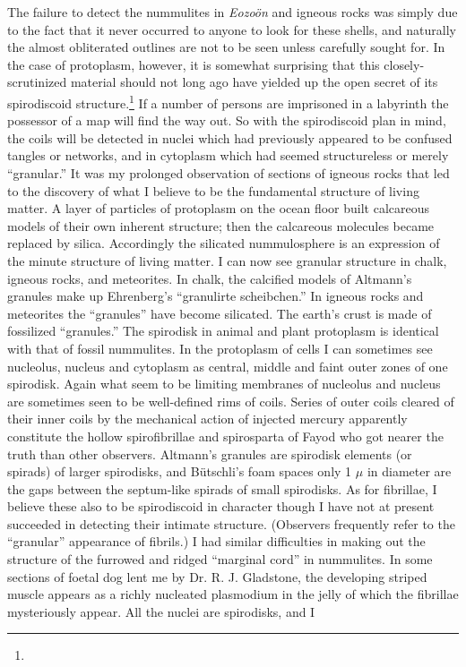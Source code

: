 \documentclass[a4paper, 12pt, oneside]{article}
\begin{document}
The failure to detect the nummulites in \emph{Eozoön} and igneous rocks was simply due to the fact that it never occurred to anyone to look for these shells, and naturally the almost obliterated outlines are not to be seen unless carefully sought for. In the case of protoplasm, however, it is somewhat surprising that this closely-scrutinized material should not long ago have yielded up the open secret of its spirodiscoid structure.\footnote{} If a number of persons are imprisoned in a labyrinth the possessor of a map will find the way out. So with the spirodiscoid plan in mind, the coils will be detected in nuclei which had previously appeared to be confused tangles or networks, and in cytoplasm which had seemed structureless or merely ``granular.'' It was my prolonged observation of sections of igneous rocks that led to the discovery of what I believe to be the fundamental structure of living matter. A layer of particles of protoplasm on the ocean floor built calcareous models of their own inherent structure; then the calcareous molecules became replaced by silica. Accordingly the silicated nummulosphere is an expression of the minute structure of living matter. I can now see granular structure in chalk, igneous rocks, and meteorites. In chalk, the calcified models of Altmann's granules make up Ehrenberg's ``granulirte scheibchen.'' In igneous rocks and meteorites the ``granules'' have become silicated. The earth's crust is made of fossilized ``granules.'' The spirodisk in animal and plant protoplasm is identical with that of fossil nummulites. In the protoplasm of cells I can sometimes see nucleolus, nucleus and cytoplasm as central, middle and faint outer zones of one spirodisk. Again what seem to be limiting membranes of nucleolus and nucleus are sometimes seen to be well-defined rims of coils. Series of outer coils cleared of their inner coils by the mechanical action of injected mercury apparently constitute the hollow spirofibrillae and spirosparta of Fayod who got nearer the truth than other observers. Altmann's granules are spirodisk elements (or spirads) of larger spirodisks, and Bütschli's foam spaces only 1 $\mu$ in diameter are the gaps between the septum-like spirads of small spirodisks. As for fibrillae, I believe these also to be spirodiscoid in character though I have not at present succeeded in detecting their intimate structure. (Observers frequently refer to the ``granular'' appearance of fibrils.) I had similar difficulties in making out the structure of the furrowed and ridged ``marginal cord'' in nummulites. In some sections of foetal dog lent me by Dr. R. J. Gladstone, the developing striped muscle appears as a richly nucleated plasmodium in the jelly of which the fibrillae mysteriously appear. All the nuclei are spirodisks, and I 
\end{document}
